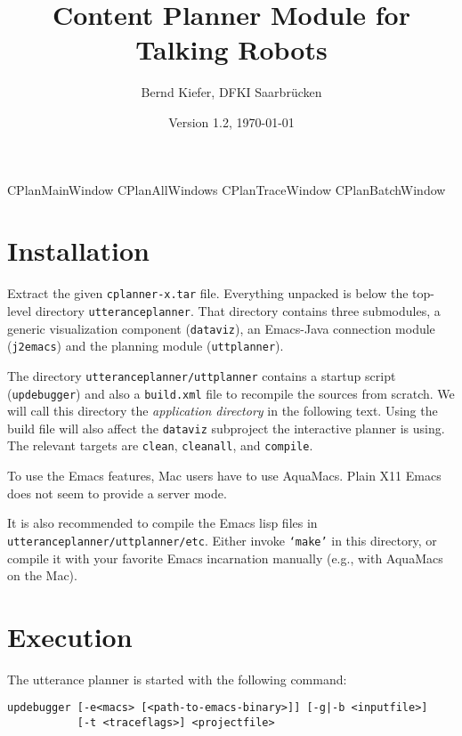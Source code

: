 \documentclass[11pt,a4paper]{article}
\title{\Large \bf Content Planner Module for Talking Robots}
\date{Version 1.2, \today}
\author{Bernd Kiefer, DFKI Saarbr\"ucken}
\begin{document}
\maketitle
\setlength{\parindent}{0em}

\newcommand{\example}{\textbf{\stepcounter{myexample}Example
    \arabic{myexample}: {}}}
{CPlanMainWindow}
{CPlanAllWindows}
{CPlanTraceWindow}
{CPlanBatchWindow}

\section{Installation}

Extract the given \texttt{cplanner-x.tar} file. Everything unpacked is below
the top-level directory \texttt{utteranceplanner}. That directory contains
three submodules, a generic visualization component (\texttt{dataviz}), an
Emacs-Java connection module (\texttt{j2emacs}) and the planning module
(\texttt{uttplanner}).

The directory \texttt{utteranceplanner/uttplanner} contains a startup script
(\texttt{updebugger}) and also a \texttt{build.xml} file to recompile the
sources from scratch. We will call this directory the \emph{application
  directory} in the following text. Using the build file will also affect the
\texttt{dataviz} subproject the interactive planner is using. The relevant
targets are \texttt{clean}, \texttt{cleanall}, and \texttt{compile}.

To use the Emacs features, Mac users have to use AquaMacs. Plain X11 Emacs
does not seem to provide a server mode.

It is also recommended to compile the Emacs lisp files in \texttt{utteranceplanner/uttplanner/etc}. Either invoke
\texttt{`make'} in this directory, or compile it with your favorite Emacs
incarnation manually (e.g., with AquaMacs on the Mac).

\section{Execution}

The utterance planner is started with the following command:
\begin{verbatim}
updebugger [-e<macs> [<path-to-emacs-binary>]] [-g|-b <inputfile>]
           [-t <traceflags>] <projectfile>
\end{verbatim}
\end{document}
